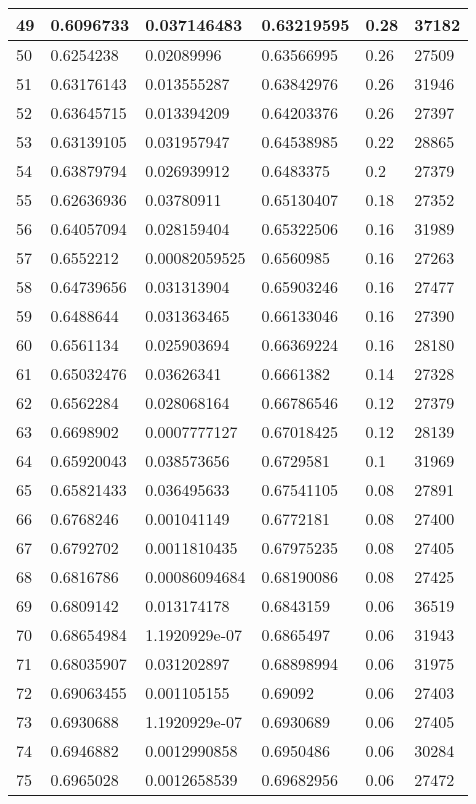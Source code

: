 \begin{longtable}{|l|l|l|l|l|l|}
49 & 0.6096733 & 0.037146483 & 0.63219595 & 0.28 & 37182 \\ \hline 
50 & 0.6254238 & 0.02089996 & 0.63566995 & 0.26 & 27509 \\ \hline 
51 & 0.63176143 & 0.013555287 & 0.63842976 & 0.26 & 31946 \\ \hline 
52 & 0.63645715 & 0.013394209 & 0.64203376 & 0.26 & 27397 \\ \hline 
53 & 0.63139105 & 0.031957947 & 0.64538985 & 0.22 & 28865 \\ \hline 
54 & 0.63879794 & 0.026939912 & 0.6483375 & 0.2 & 27379 \\ \hline 
55 & 0.62636936 & 0.03780911 & 0.65130407 & 0.18 & 27352 \\ \hline 
56 & 0.64057094 & 0.028159404 & 0.65322506 & 0.16 & 31989 \\ \hline 
57 & 0.6552212 & 0.00082059525 & 0.6560985 & 0.16 & 27263 \\ \hline 
58 & 0.64739656 & 0.031313904 & 0.65903246 & 0.16 & 27477 \\ \hline 
59 & 0.6488644 & 0.031363465 & 0.66133046 & 0.16 & 27390 \\ \hline 
60 & 0.6561134 & 0.025903694 & 0.66369224 & 0.16 & 28180 \\ \hline 
61 & 0.65032476 & 0.03626341 & 0.6661382 & 0.14 & 27328 \\ \hline 
62 & 0.6562284 & 0.028068164 & 0.66786546 & 0.12 & 27379 \\ \hline 
63 & 0.6698902 & 0.0007777127 & 0.67018425 & 0.12 & 28139 \\ \hline 
64 & 0.65920043 & 0.038573656 & 0.6729581 & 0.1 & 31969 \\ \hline 
65 & 0.65821433 & 0.036495633 & 0.67541105 & 0.08 & 27891 \\ \hline 
66 & 0.6768246 & 0.001041149 & 0.6772181 & 0.08 & 27400 \\ \hline 
67 & 0.6792702 & 0.0011810435 & 0.67975235 & 0.08 & 27405 \\ \hline 
68 & 0.6816786 & 0.00086094684 & 0.68190086 & 0.08 & 27425 \\ \hline 
69 & 0.6809142 & 0.013174178 & 0.6843159 & 0.06 & 36519 \\ \hline 
70 & 0.68654984 & 1.1920929e-07 & 0.6865497 & 0.06 & 31943 \\ \hline 
71 & 0.68035907 & 0.031202897 & 0.68898994 & 0.06 & 31975 \\ \hline 
72 & 0.69063455 & 0.001105155 & 0.69092 & 0.06 & 27403 \\ \hline 
73 & 0.6930688 & 1.1920929e-07 & 0.6930689 & 0.06 & 27405 \\ \hline 
74 & 0.6946882 & 0.0012990858 & 0.6950486 & 0.06 & 30284 \\ \hline 
75 & 0.6965028 & 0.0012658539 & 0.69682956 & 0.06 & 27472 \\ \hline 
\end{longtable}